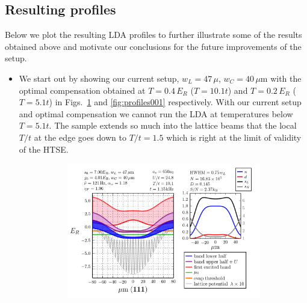 \documentclass[11pt,letter]{article}
\begin{document}
\subsection{ Resulting profiles }

Below we plot the resulting LDA profiles to further illustrate some of the
results obtained above and motivate our conclusions for the future improvements
of the setup.  
 

\begin{itemize} 

\item We start out by showing our current setup,  $w_{L}=47\,\mu$,
$w_{C}=40\,\mu$m with the optimal compensation obtained at $T=0.4\,E_{R}$
($T=10.1t$) and $T=0.2\,E_{R}$ ($T=5.1t$) in Figs.~\ref{fig:profiles000} and
\ref{fig:profiles001} respectively.    With our current setup and optimal
compensation we cannot run the LDA at temperatures below $T=5.1t$.  The sample
extends so much into the lattice beams that the local $T/t$ at the edge goes
down to $T/t=1.5$ which is right at the limit of validity of the HTSE. 
\begin{figure}[H]
        \centering
        \begin{subfigure}[t]{0.42\textwidth}
		\includegraphics[width=\textwidth]{figures_hubbard-lda/000.png}
\caption{ }
                \label{fig:profiles000}
        \end{subfigure}%
        ~~ %
        \begin{subfigure}[t]{0.42\textwidth}

\end{subfigure}
\end{figure}
\end{itemize}
\end{document}
